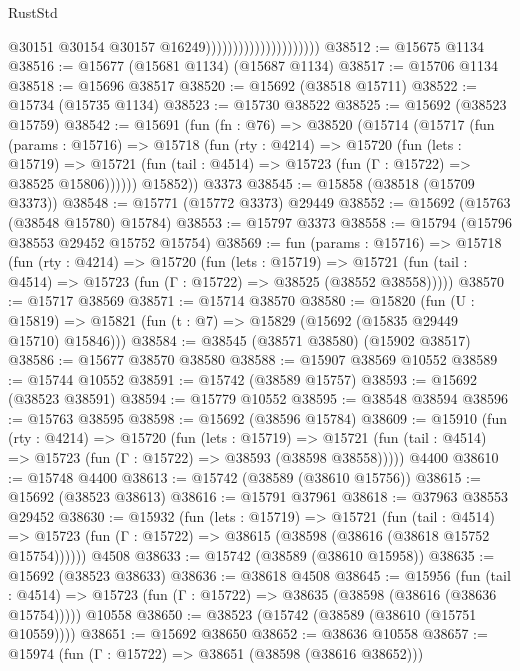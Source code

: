 \begin{lexlean}{RustStd}
\begin{coremodule}
                                              @30151
                                              @30154
                                              @30157
                                              @16249)))))))))))))))))))))
@38512 := @15675 @1134
@38516 := @15677 (@15681 @1134) (@15687 @1134)
@38517 := @15706 @1134
@38518 := @15696 @38517
@38520 := @15692 (@38518 @15711)
@38522 := @15734 (@15735 @1134)
@38523 := @15730 @38522
@38525 := @15692 (@38523 @15759)
@38542 := @15691
    (fun (fn : @76) =>
    @38520
      (@15714
        (@15717
          (fun (params : @15716) =>
          @15718
            (fun (rty : @4214) =>
            @15720
              (fun (lets : @15719) =>
              @15721 (fun (tail : @4514) => @15723 (fun (Γ : @15722) => @38525 @15806))))))
        @15852))
    @3373
@38545 := @15858 (@38518 (@15709 @3373))
@38548 := @15771 (@15772 @3373) @29449
@38552 := @15692 (@15763 (@38548 @15780) @15784)
@38553 := @15797 @3373
@38558 := @15794 (@15796 @38553 @29452 @15752 @15754)
@38569 := fun (params : @15716) =>
  @15718
    (fun (rty : @4214) =>
    @15720
      (fun (lets : @15719) =>
      @15721 (fun (tail : @4514) => @15723 (fun (Γ : @15722) => @38525 (@38552 @38558)))))
@38570 := @15717 @38569
@38571 := @15714 @38570
@38580 := @15820
    (fun (U : @15819) => @15821 (fun (t : @7) => @15829 (@15692 (@15835 @29449 @15710) @15846)))
@38584 := @38545 (@38571 @38580) (@15902 @38517)
@38586 := @15677 @38570 @38580
@38588 := @15907 @38569 @10552
@38589 := @15744 @10552
@38591 := @15742 (@38589 @15757)
@38593 := @15692 (@38523 @38591)
@38594 := @15779 @10552
@38595 := @38548 @38594
@38596 := @15763 @38595
@38598 := @15692 (@38596 @15784)
@38609 := @15910
    (fun (rty : @4214) =>
    @15720
      (fun (lets : @15719) =>
      @15721 (fun (tail : @4514) => @15723 (fun (Γ : @15722) => @38593 (@38598 @38558)))))
    @4400
@38610 := @15748 @4400
@38613 := @15742 (@38589 (@38610 @15756))
@38615 := @15692 (@38523 @38613)
@38616 := @15791 @37961
@38618 := @37963 @38553 @29452
@38630 := @15932
    (fun (lets : @15719) =>
    @15721
      (fun (tail : @4514) =>
      @15723 (fun (Γ : @15722) => @38615 (@38598 (@38616 (@38618 @15752 @15754))))))
    @4508
@38633 := @15742 (@38589 (@38610 @15958))
@38635 := @15692 (@38523 @38633)
@38636 := @38618 @4508
@38645 := @15956
    (fun (tail : @4514) => @15723 (fun (Γ : @15722) => @38635 (@38598 (@38616 (@38636 @15754)))))
    @10558
@38650 := @38523 (@15742 (@38589 (@38610 (@15751 @10559))))
@38651 := @15692 @38650
@38652 := @38636 @10558
@38657 := @15974 (fun (Γ : @15722) => @38651 (@38598 (@38616 @38652)))

\end{coremodule}
\end{lexlean}

